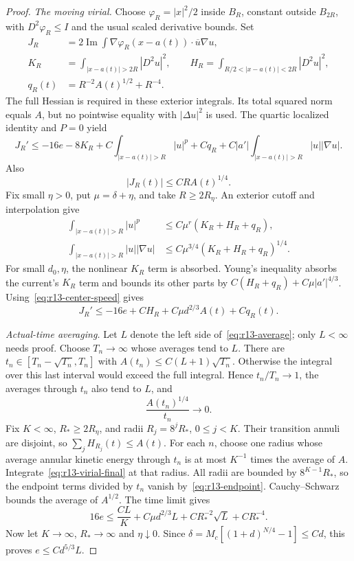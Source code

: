 \begin{proof}
\medskip\noindent\emph{The moving virial.}
Choose $\varphi_R=|x|^2/2$ inside $B_R$, constant outside $B_{2R}$,
with $D^2\varphi_R\le I$ and the usual scaled derivative bounds.
Set
\begin{align*}
 J_R&=2\operatorname{Im}\int\nabla\varphi_R(x-a(t))
                \cdot\overline u\nabla u,\\
 K_R&=\int_{|x-a(t)|>2R}|D^2u|^2,\qquad
 H_R=\int_{R/2<|x-a(t)|<2R}|D^2u|^2,\\
 q_R(t)&=R^{-2}A(t)^{1/2}+R^{-4}.
\end{align*}
The full Hessian is required in these exterior integrals. Its total
squared norm equals $A$, but no pointwise equality with $|\Delta u|^2$
is used. The quartic localized identity and $P=0$ yield
\begin{equation}\label{eq:r13-virial-raw}
 J_R'\le-16e-8K_R+C\int_{|x-a(t)|>R}|u|^p+Cq_R
       +C|a'|\int_{|x-a(t)|>R}|u||\nabla u|.
\end{equation}
Also
\begin{equation}\label{eq:r13-endpoint}
 |J_R(t)|\le CR A(t)^{1/4}.
\end{equation}
Fix small $\eta>0$, put $\mu=\delta+\eta$, and take
$R\ge2R_\eta$. An exterior cutoff and interpolation give
\begin{align*}
 \int_{|x-a(t)|>R}|u|^p
     &\le C\mu^r(K_R+H_R+q_R),\\
 \int_{|x-a(t)|>R}|u||\nabla u|
     &\le C\mu^{3/4}(K_R+H_R+q_R)^{1/4}.
\end{align*}
For small $d_0,\eta$, the nonlinear $K_R$ term is absorbed.
Young's inequality absorbs the current's $K_R$ term and bounds its
other parts by $C(H_R+q_R)+C\mu|a'|^{4/3}$.
Using~\eqref{eq:r13-center-speed} gives
\begin{equation}\label{eq:r13-virial-final}
 J_R'\le-16e+CH_R+C\mu d^{2/3}A(t)+Cq_R(t).
\end{equation}

\medskip\noindent\emph{Actual-time averaging.}
Let $L$ denote the left side of~\eqref{eq:r13-average}; only $L<\infty$
needs proof. Choose $T_n\to\infty$ whose averages tend to $L$.
There are $t_n\in[T_n-\sqrt{T_n},T_n]$ with
$A(t_n)\le C(L+1)\sqrt{T_n}$. Otherwise the integral over this last
interval would exceed the full integral. Hence $t_n/T_n\to1$, the
averages through $t_n$ also tend to $L$, and
\[
 \frac{A(t_n)^{1/4}}{t_n}\longrightarrow0.
\]
Fix $K<\infty$, $R_*\ge2R_\eta$, and radii $R_j=8^jR_*$,
$0\le j<K$. Their transition annuli are disjoint, so
$\sum_jH_{R_j}(t)\le A(t)$. For each $n$, choose one radius whose
average annular kinetic energy through $t_n$ is at most $K^{-1}$ times
the average of $A$. Integrate~\eqref{eq:r13-virial-final} at that radius.
All radii are bounded by $8^{K-1}R_*$, so the endpoint terms divided
by $t_n$ vanish by~\eqref{eq:r13-endpoint}. Cauchy--Schwarz bounds the
average of $A^{1/2}$. The time limit gives
\[
 16e\le\frac{CL}{K}+C\mu d^{2/3}L
       +CR_*^{-2}\sqrt L+CR_*^{-4}.
\]
Now let $K\to\infty$, $R_*\to\infty$ and $\eta\downarrow0$.
Since $\delta=M_c[(1+d)^{N/4}-1]\le Cd$, this proves
$e\le Cd^{5/3}L$.
\end{proof}

